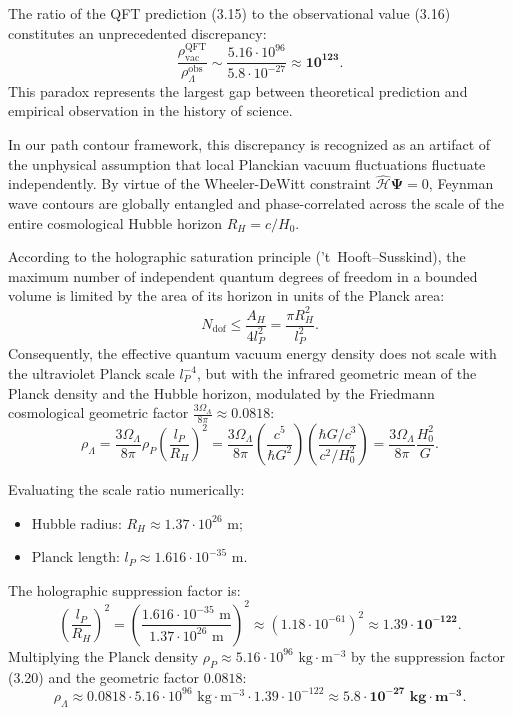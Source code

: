 The ratio of the QFT prediction (3.15) to the observational value (3.16) constitutes an unprecedented discrepancy:
\begin{equation}\label{eq:3.17}\tag{3.17}
\frac{\rho_{\text{vac}}^{\text{QFT}}}{\rho_{\Lambda}^{\text{obs}}} \sim \frac{5.16 \cdot 10^{96}}{5.8 \cdot 10^{-27}} \approx \mathbf{10^{123}}.
\end{equation}
This paradox represents the largest gap between theoretical prediction and empirical observation in the history of science.

In our path contour framework, this discrepancy is recognized as an artifact of the unphysical assumption that local Planckian vacuum fluctuations fluctuate independently. By virtue of the Wheeler-DeWitt constraint $\hat{\mathcal{H}}\mathbf{\Psi} = 0$, Feynman wave contours are globally entangled and phase-correlated across the scale of the entire cosmological Hubble horizon $R_H = c/H_0$.

According to the holographic saturation principle ('t~Hooft--Susskind), the maximum number of independent quantum degrees of freedom in a bounded volume is limited by the area of its horizon in units of the Planck area:
\begin{equation}\label{eq:3.18}\tag{3.18}
N_{\text{dof}} \le \frac{A_H}{4 l_P^2} = \frac{\pi R_H^2}{l_P^2}.
\end{equation}
Consequently, the effective quantum vacuum energy density does not scale with the ultraviolet Planck scale $l_P^{-4}$, but with the infrared geometric mean of the Planck density and the Hubble horizon, modulated by the Friedmann cosmological geometric factor $\frac{3\Omega_\Lambda}{8\pi} \approx 0.0818$:
\begin{equation}\label{eq:3.19}\tag{3.19}
\rho_\Lambda = \frac{3\Omega_\Lambda}{8\pi} \rho_P \left( \frac{l_P}{R_H} \right)^2 = \frac{3\Omega_\Lambda}{8\pi} \left( \frac{c^5}{\hbar G^2} \right) \left( \frac{\hbar G / c^3}{c^2 / H_0^2} \right) = \frac{3\Omega_\Lambda}{8\pi} \frac{H_0^2}{G}.
\end{equation}

Evaluating the scale ratio numerically:
\begin{itemize}
\item Hubble radius: $R_H \approx 1.37 \cdot 10^{26}\text{ m}$;
\item Planck length: $l_P \approx 1.616 \cdot 10^{-35}\text{ m}$.
\end{itemize}
The holographic suppression factor is:
\begin{equation}\label{eq:3.20}\tag{3.20}
\left( \frac{l_P}{R_H} \right)^2 = \left( \frac{1.616 \cdot 10^{-35}\text{ m}}{1.37 \cdot 10^{26}\text{ m}} \right)^2 \approx (1.18 \cdot 10^{-61})^2 \approx \mathbf{1.39 \cdot 10^{-122}}.
\end{equation}
Multiplying the Planck density $\rho_P \approx 5.16 \cdot 10^{96}\text{ kg}\cdot\text{m}^{-3}$ by the suppression factor (3.20) and the geometric factor $0.0818$:
\begin{equation}\label{eq:3.21}\tag{3.21}
\rho_\Lambda \approx 0.0818 \cdot 5.16 \cdot 10^{96}\text{ kg}\cdot\text{m}^{-3} \cdot 1.39 \cdot 10^{-122} \approx \mathbf{5.8 \cdot 10^{-27}\text{ kg}\cdot\text{m}^{-3}}.
\end{equation}

